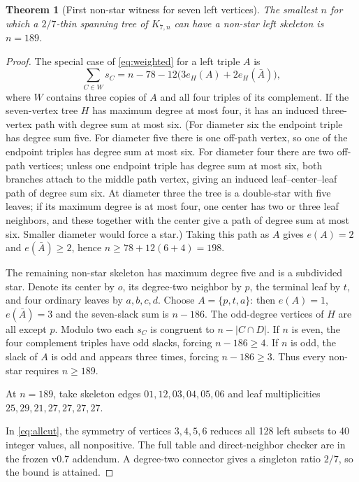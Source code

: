 \documentclass[11pt,a4paper]{article}
\newtheorem{theorem}{Theorem}[section]
\newcommand{\KK}[2]{K_{#1,#2}}
\begin{document}
\begin{theorem}[First non-star witness for seven left vertices]\label{thm:k7nonstar}
The smallest $n$ for which a $2/7$-thin spanning tree of $\KK{7}{n}$ can have a non-star left skeleton is $n=189$.
\end{theorem}
\begin{proof}
The special case of \eqref{eq:weighted} for a left triple $A$ is
\[
\sum_{C\in W}s_C=n-78-12\bigl(3e_H(A)+2e_H(\bar A)\bigr),
\]
where $W$ contains three copies of $A$ and all four triples of its complement. If the seven-vertex tree $H$ has maximum degree at most four, it has an induced three-vertex path with degree sum at most six. (For diameter six the endpoint triple has degree sum five. For diameter five there is one off-path vertex, so one of the endpoint triples has degree sum at most six. For diameter four there are two off-path vertices; unless one endpoint triple has degree sum at most six, both branches attach to the middle path vertex, giving an induced leaf--center--leaf path of degree sum six. At diameter three the tree is a double-star with five leaves; if its maximum degree is at most four, one center has two or three leaf neighbors, and these together with the center give a path of degree sum at most six. Smaller diameter would force a star.) Taking this path as $A$ gives $e(A)=2$ and $e(\bar A)\ge2$, hence $n\ge78+12(6+4)=198$.

The remaining non-star skeleton has maximum degree five and is a subdivided star. Denote its center by $o$, its degree-two neighbor by $p$, the terminal leaf by $t$, and four ordinary leaves by $a,b,c,d$. Choose $A=\{p,t,a\}$: then $e(A)=1$, $e(\bar A)=3$ and the seven-slack sum is $n-186$. The odd-degree vertices of $H$ are all except $p$. Modulo two each $s_C$ is congruent to $n-|C\cap D|$. If $n$ is even, the four complement triples have odd slacks, forcing $n-186\ge4$. If $n$ is odd, the slack of $A$ is odd and appears three times, forcing $n-186\ge3$. Thus every non-star requires $n\ge189$.

At $n=189$, take skeleton edges $01,12,03,04,05,06$ and leaf multiplicities \(25,29,21,27,27,27,27\).\par\smallskip\noindent In \eqref{eq:allcut}, the symmetry of vertices $3,4,5,6$ reduces all 128 left subsets to 40 integer values, all nonpositive. The full table and direct-neighbor checker are in the frozen v0.7 addendum. A degree-two connector gives a singleton ratio $2/7$, so the bound is attained.\end{proof}
\end{document}
